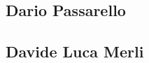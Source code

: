 \subsection{Dario Passarello}
\begin{itemize}
\end{itemize}

\subsection{Davide Luca Merli}
\begin{itemize}
\end{itemize}
